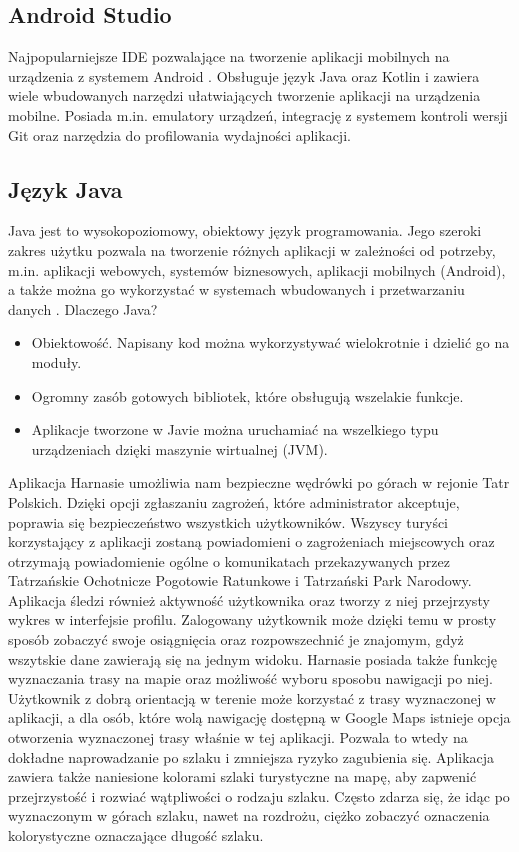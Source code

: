 \subsection*{Android Studio}
Najpopularniejsze IDE pozwalające na tworzenie aplikacji mobilnych na urządzenia z systemem Android \cite{androidstudio} \cite{android-studio-book}. Obsługuje język Java oraz Kotlin i zawiera wiele wbudowanych narzędzi ułatwiających tworzenie aplikacji na urządzenia mobilne. Posiada m.in. emulatory urządzeń, integrację z systemem kontroli wersji Git oraz narzędzia do profilowania wydajności aplikacji.

\subsection*{Język Java}
Java \cite{java} jest to wysokopoziomowy, obiektowy język programowania. Jego szeroki zakres użytku pozwala na tworzenie różnych aplikacji w zależności od potrzeby, m.in. aplikacji webowych, systemów biznesowych, aplikacji mobilnych (Android), a także można go wykorzystać w systemach wbudowanych i przetwarzaniu danych \cite{java-book}.
Dlaczego Java?
\begin{itemize}
    \item Obiektowość. Napisany kod można wykorzystywać wielokrotnie i dzielić go na moduły.
    \item Ogromny zasób gotowych bibliotek, które obsługują wszelakie funkcje.
    \item Aplikacje tworzone w Javie można uruchamiać na wszelkiego typu urządzeniach dzięki maszynie wirtualnej (JVM).
\end{itemize}

Aplikacja Harnasie umożliwia nam bezpieczne wędrówki po górach w rejonie Tatr Polskich. Dzięki opcji zgłaszaniu zagrożeń, które administrator akceptuje, poprawia się bezpieczeństwo wszystkich użytkowników. Wszyscy turyści korzystający z aplikacji zostaną powiadomieni o zagrożeniach miejscowych oraz otrzymają powiadomienie ogólne o komunikatach przekazywanych przez Tatrzańskie Ochotnicze Pogotowie Ratunkowe i Tatrzański Park Narodowy. Aplikacja śledzi również aktywność użytkownika oraz tworzy z niej przejrzysty wykres w interfejsie profilu. Zalogowany użytkownik może dzięki temu w prosty sposób zobaczyć swoje osiągnięcia oraz rozpowszechnić je znajomym, gdyż wszytskie dane zawierają się na jednym widoku. Harnasie posiada także funkcję wyznaczania trasy na mapie oraz możliwość wyboru sposobu nawigacji po niej. Użytkownik z dobrą orientacją w terenie może korzystać z trasy wyznaczonej w aplikacji, a dla osób, które wolą nawigację dostępną w Google Maps istnieje opcja otworzenia wyznaczonej trasy właśnie w tej aplikacji. Pozwala to wtedy na dokładne naprowadzanie po szlaku i zmniejsza ryzyko zagubienia się. Aplikacja zawiera także naniesione kolorami szlaki turystyczne na mapę, aby zapwenić przejrzystość i rozwiać wątpliwości o rodzaju szlaku. Często zdarza się, że idąc po wyznaczonym w górach szlaku, nawet na rozdrożu, ciężko zobaczyć oznaczenia kolorystyczne oznaczające długość szlaku. 


  